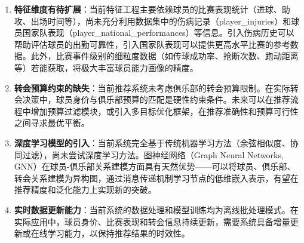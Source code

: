 \documentclass[a4paper]{article}
\begin{document}
\begin{enumerate}
    \item \textbf{特征维度有待扩展}：当前特征工程主要依赖球员的比赛表现统计（进球、助攻、出场时间等），尚未充分利用数据集中的伤病记录（player\_injuries）和球员国家队表现（player\_national\_performances）等信息。引入伤病历史可以帮助评估球员的出勤可靠性，引入国家队表现可以提供更高水平比赛的参考数据。此外，比赛事件级别的细粒度数据（如传球成功率、抢断次数、跑动距离等）若能获取，将极大丰富球员能力画像的精度。
    
    \item \textbf{转会预算约束的缺失}：当前推荐系统未考虑俱乐部的转会预算限制。在实际转会决策中，球员身价与俱乐部预算的匹配是硬性约束条件。未来可以在推荐流程中增加预算过滤模块，或引入多目标优化框架，在推荐准确性和预算可行性之间寻求最优平衡。
    
    \item \textbf{深度学习模型的引入}：当前系统完全基于传统机器学习方法（余弦相似度、协同过滤），尚未尝试深度学习方法。图神经网络（Graph Neural Networks, GNN）在球员-俱乐部关系建模方面具有天然优势——可以将球员、俱乐部、转会关系建模为异构图，通过消息传递机制学习节点的低维嵌入表示，有望在推荐精度和泛化能力上实现新的突破。
    
    \item \textbf{实时数据更新能力}：当前系统的数据处理和模型训练均为离线批处理模式。在实际应用中，球员身价、比赛表现和转会信息持续更新，需要系统具备增量更新或在线学习能力，以保持推荐结果的时效性。

\end{enumerate}
\end{document}
